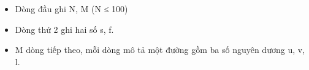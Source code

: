 \begin{itemize}
	\item Dòng đầu ghi N, M (N ≤ 100)
	\item Dòng thứ 2 ghi hai số s, f.
	\item M dòng tiếp theo, mỗi dòng mô tả một đường gồm ba số nguyên dương u, v, l.
\end{itemize}